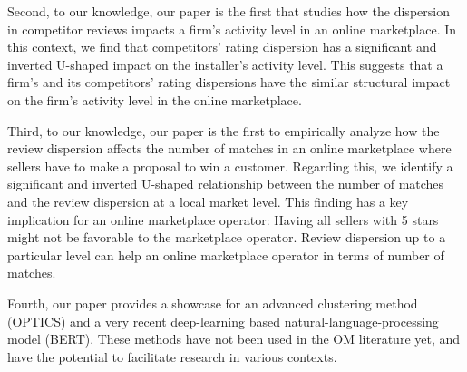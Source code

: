 \documentclass[mnsc,blindrev]{informs3}
\begin{document}
	
Second, to our knowledge, our paper is the first that studies how the dispersion in competitor reviews impacts a firm's activity level in an online marketplace. In this context, we find that competitors' rating dispersion has a significant and inverted U-shaped impact on the installer's activity level. This suggests that a firm's and its competitors' rating dispersions have the similar structural impact on the firm's activity level in the online marketplace.

Third, to our knowledge, our paper is the first to empirically analyze how the review dispersion affects the number of matches in an online marketplace where sellers have to make a proposal to win a customer. Regarding this, we identify a significant and inverted U-shaped relationship between the number of matches and the review dispersion at a local market level. This finding has a key implication for an online marketplace operator: Having all sellers with 5 stars might not be favorable to the marketplace operator. Review dispersion up to a particular level can help an online marketplace operator in terms of number of matches.

Fourth, our paper provides a showcase for an advanced clustering method (OPTICS) and a very recent deep-learning based natural-language-processing model (BERT). These methods have not been used in the OM literature yet, and have the potential to facilitate research in various contexts.

	
	
	
\end{document}
